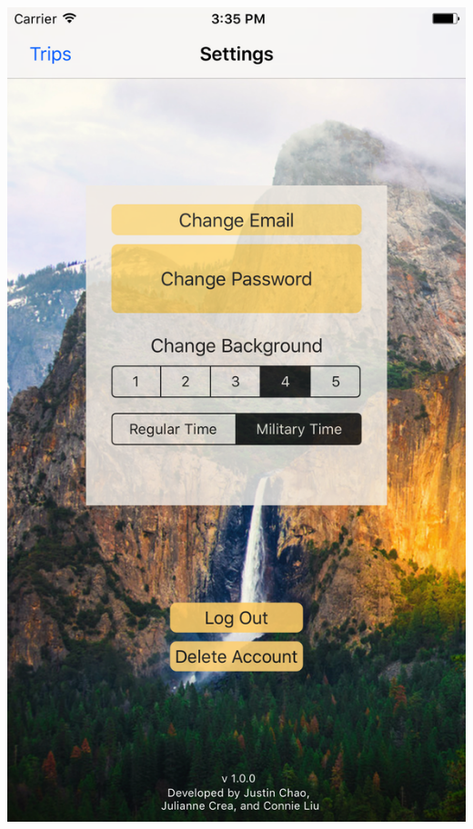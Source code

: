 \documentclass{beamer}
\begin{document}
\begin{frame}
\begin{columns}
\begin{column}{0.3\textwidth}
\begin{center}
            \includegraphics[scale=0.08]{settings3}
        \end{center}
    \end{column}
\end{columns}
\end{frame}
\end{document}
